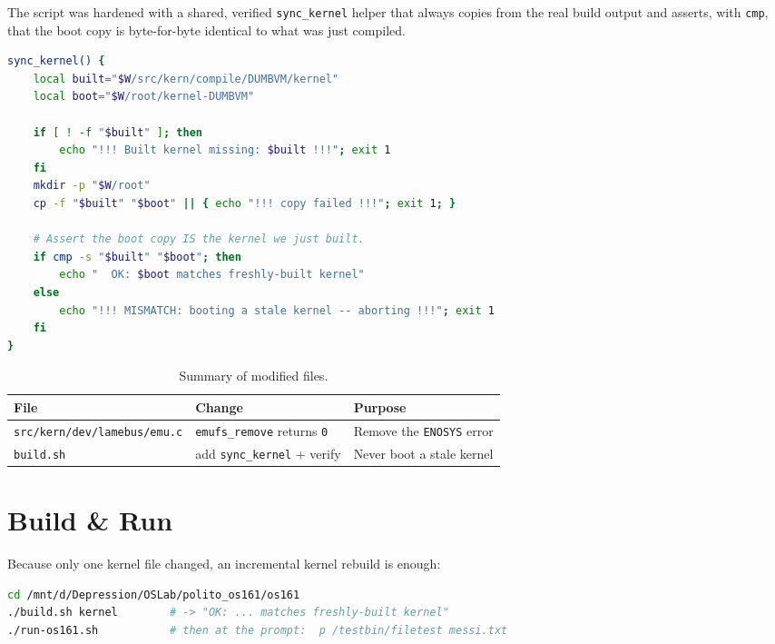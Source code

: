\documentclass[11pt,a4paper]{article}
\begin{document}
The script was hardened with a shared, verified \texttt{sync\_kernel} helper
that always copies from the real build output and asserts, with \texttt{cmp},
that the boot copy is byte-for-byte identical to what was just compiled.

\begin{lstlisting}[language=bash,caption={New \texttt{sync\_kernel} helper added to \texttt{build.sh} (used by both \texttt{all} and \texttt{kernel} modes).},label=lst:build]
sync_kernel() {
    local built="$W/src/kern/compile/DUMBVM/kernel"
    local boot="$W/root/kernel-DUMBVM"

    if [ ! -f "$built" ]; then
        echo "!!! Built kernel missing: $built !!!"; exit 1
    fi
    mkdir -p "$W/root"
    cp -f "$built" "$boot" || { echo "!!! copy failed !!!"; exit 1; }

    # Assert the boot copy IS the kernel we just built.
    if cmp -s "$built" "$boot"; then
        echo "  OK: $boot matches freshly-built kernel"
    else
        echo "!!! MISMATCH: booting a stale kernel -- aborting !!!"; exit 1
    fi
}
\end{lstlisting}

\begin{table}[h]
\centering
\caption{Summary of modified files.}
\begin{tabular}{@{}lll@{}}
\toprule
\textbf{File} & \textbf{Change} & \textbf{Purpose} \\
\midrule
\texttt{src/kern/dev/lamebus/emu.c} & \texttt{emufs\_remove} returns \texttt{0} & Remove the \texttt{ENOSYS} error \\
\texttt{build.sh} & add \texttt{sync\_kernel} + verify & Never boot a stale kernel \\
\bottomrule
\end{tabular}
\end{table}

\section{Build \& Run}
Because only one kernel file changed, an incremental kernel rebuild is enough:

\begin{lstlisting}[language=bash,caption={Rebuild and run from the Ubuntu WSL shell.}]
cd /mnt/d/Depression/OSLab/polito_os161/os161
./build.sh kernel        # -> "OK: ... matches freshly-built kernel"
./run-os161.sh           # then at the prompt:  p /testbin/filetest messi.txt
\end{lstlisting}
\end{document}
